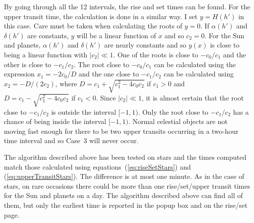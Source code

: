 \documentclass[12pt]{article}
\begin{document}
By going through all the 12 intervals, the rise and set times can be found. 
For the upper transit time, the calculation is done in a similar way. I set 
$y = H(h')$ in this case. Care must be taken when calculating the roots of $y=0$. 
If $\alpha(h')$ and $\delta(h')$ are constants, $y$ will be a linear function of $x$ 
and so $c_2=0$. For the Sun and planets, $\alpha(h')$ and $\delta(h')$ 
are nearly constants and so $y(x)$ is close to being a linear function with $|c_2|\ll 1$. 
One of the roots is close to $-c_0/c_1$ and the other is close to $-c_1/c_2$. 
The root close to $-c_0/c_1$ can be calculated using the expression $x_1=-2c_0/D$ 
and the one close to $-c_1/c_2$ can be calculated using $x_2=-D/(2 c_2)$, where 
$D=c_1+\sqrt{c_1^2-4c_0c_2}$ if $c_1>0$ and $D=c_1-\sqrt{c_1^2-4c_0c_2}$ if $c_1<0$. 
Since $|c_2|\ll 1$, it is almost certain that the root close to $-c_1/c_2$ 
is outside the interval $[-1,1)$. Only the root close to $-c_1/c_2$ has a chance 
of being inside the interval $[-1,1)$. Normal celestial objects are not moving 
fast enough for there to be two upper transits occurring in a two-hour time interval 
and so Case~3 will never occur.

The algorithm described above has been tested on stars and the times computed 
match those calculated using equations~(\ref{eq:riseSetStars}) and 
(\ref{eq:upperTransitStars}). The difference is at most one minute.
As in the case of stars, on rare occasions there could be more than one 
rise/set/upper transit times for the Sun and planets on a day. The 
algorithm described above can find all of them, but only the earliest 
time is reported in the popup box and on the rise/set page.
\end{document}
